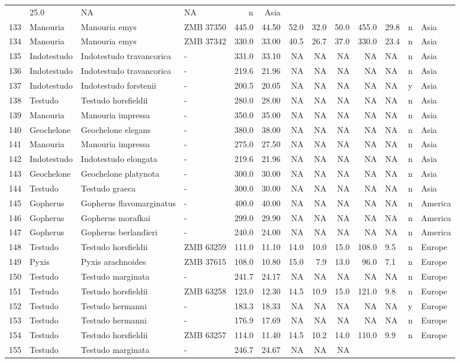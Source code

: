 \documentclass[]{article}
\begin{document}
\begin{longtable}[]{@{}llllrrrrrrlll@{}}
& 25.0 & NA & NA & n & Asia\tabularnewline
133 & Manouria & Manouria emys & ZMB 37350 & 445.0 & 44.50 & 52.0 & 32.0
& 50.0 & 455.0 & 29.8 & n & Asia\tabularnewline
134 & Manouria & Manouria emys & ZMB 37342 & 330.0 & 33.00 & 40.5 & 26.7
& 37.0 & 330.0 & 23.4 & n & Asia\tabularnewline
135 & Indotestudo & Indotestudo travancorica & - & 331.0 & 33.10 & NA &
NA & NA & NA & NA & n & Asia\tabularnewline
136 & Indotestudo & Indotestudo travancorica & - & 219.6 & 21.96 & NA &
NA & NA & NA & NA & n & Asia\tabularnewline
137 & Indotestudo & Indotestudo forstenii & - & 200.5 & 20.05 & NA & NA
& NA & NA & NA & y & Asia\tabularnewline
138 & Testudo & Testudo horsfieldii & - & 280.0 & 28.00 & NA & NA & NA &
NA & NA & n & Asia\tabularnewline
139 & Manouria & Manouria impressa & - & 350.0 & 35.00 & NA & NA & NA &
NA & NA & n & Asia\tabularnewline
140 & Geochelone & Geochelone elegans & - & 380.0 & 38.00 & NA & NA & NA
& NA & NA & n & Asia\tabularnewline
141 & Manouria & Manouria impressa & - & 275.0 & 27.50 & NA & NA & NA &
NA & NA & n & Asia\tabularnewline
142 & Indotestudo & Indotestudo elongata & - & 219.6 & 21.96 & NA & NA &
NA & NA & NA & n & Asia\tabularnewline
143 & Geochelone & Geochelone platynota & - & 300.0 & 30.00 & NA & NA &
NA & NA & NA & n & Asia\tabularnewline
144 & Testudo & Testudo graeca & - & 300.0 & 30.00 & NA & NA & NA & NA &
NA & n & Asia\tabularnewline
145 & Gopherus & Gopherus flavomarginatus & - & 400.0 & 40.00 & NA & NA
& NA & NA & NA & n & America\tabularnewline
146 & Gopherus & Gopherus morafkai & - & 299.0 & 29.90 & NA & NA & NA &
NA & NA & n & America\tabularnewline
147 & Gopherus & Gopherus berlandieri & - & 240.0 & 24.00 & NA & NA & NA
& NA & NA & n & America\tabularnewline
148 & Testudo & Testudo horsfieldii & ZMB 63259 & 111.0 & 11.10 & 14.0 &
10.0 & 15.0 & 108.0 & 9.5 & n & Europe\tabularnewline
149 & Pyxis & Pyxis arachnoides & ZMB 37615 & 108.0 & 10.80 & 15.0 & 7.9
& 13.0 & 96.0 & 7.1 & n & Europe\tabularnewline
150 & Testudo & Testudo marginata & - & 241.7 & 24.17 & NA & NA & NA &
NA & NA & n & Europe\tabularnewline
151 & Testudo & Testudo horsfieldii & ZMB 63258 & 123.0 & 12.30 & 14.5 &
10.9 & 15.0 & 121.0 & 9.8 & n & Europe\tabularnewline
152 & Testudo & Testudo hermanni & - & 183.3 & 18.33 & NA & NA & NA & NA
& NA & y & Europe\tabularnewline
153 & Testudo & Testudo hermanni & - & 176.9 & 17.69 & NA & NA & NA & NA
& NA & n & Europe\tabularnewline
154 & Testudo & Testudo horsfieldii & ZMB 63257 & 114.0 & 11.40 & 14.5 &
10.2 & 14.0 & 110.0 & 9.9 & n & Europe\tabularnewline
155 & Testudo & Testudo marginata & - & 246.7 & 24.67 & NA & NA & NA &

\end{longtable}
\end{document}
